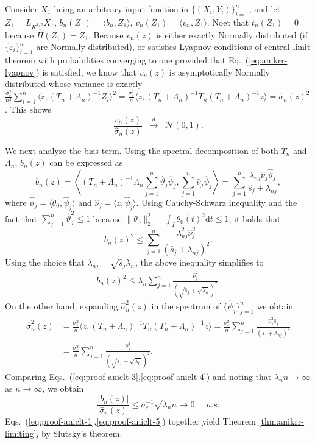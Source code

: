 \documentclass[11pt,a4paper]{article}
\renewcommand{\hat}{\widehat}
\theoremstyle{definition}
\theoremstyle{plain}
\theoremstyle{remark}
\newcommand{\ud}{\mathrm d}
\begin{document}
Consider $X_1$ being an arbitrary input function in $\{(X_i,Y_i)\}_{i=1}^n$,
and let $Z_1=L_{K^{1/2}}X_1$, $b_n(Z_1)=\langle b_n,Z_1\rangle$, $v_n(Z_1)=\langle v_n,Z_1\rangle$.
Noet that $t_n(Z_1)=0$ because $\hat\Pi(Z_1)=Z_1$.
Because $v_n(z)$ is either exactly Normally distributed (if $\{\varepsilon_i\}_{i=1}^n$ are Normally distributed), or satisfies Lyapnov conditions of central limit theorem with probabilities converging to one
provided that Eq.~(\ref{eq:anikrr-lyapnov}) is satisfied, we know that $v_n(z)$ is asymptotically Normally distributed whose variance is exactly $\frac{\sigma_\varepsilon^2}{n^2}\sum_{i=1}^n\langle z, (T_n+\Lambda_n)^{-1}Z_i\rangle^2 = \frac{\sigma_\varepsilon^2}{n}\langle z, (T_n+\Lambda_n)^{-1}T_n(T_n+\Lambda_n)^{-1}z\rangle=\hat\sigma_n(z)^2$. This shows
\begin{equation}
\frac{v_n(z)}{\hat\sigma_n(z)}\;\;\overset{d}{\to}\;\;\mathcal N(0,1).
\label{eq:proof-aniclt-2}
\end{equation}

We next analyze the bias term. Using the spectral decomposition of both $T_n$ and $\Lambda_n$, $b_n(z)$ can be expressed as
$$
b_n(z) = \left\langle(T_n+\Lambda_n)^{-1}\Lambda_n\sum_{j=1}^n\hat\vartheta_j\hat\psi_j, \sum_{j=1}^n\hat\nu_j\hat\psi_j\right\rangle = \sum_{j=1}^n\frac{\lambda_{nj}\hat\nu_j\hat\vartheta_j}{\hat s_j+\lambda_{nj}},
$$
where $\hat\vartheta_j=\langle\theta_0,\hat\psi_j\rangle$ and $\hat\nu_j = \langle z,\hat\psi_j\rangle$.
Using Cauchy-Schwarz inequality and the fact that $\sum_{j=1}^n\hat\vartheta_j^2\leq 1$ because $\|\theta_0\|_2^2 = \int_I\theta_0(t)^2\ud t\leq 1$, it holds that
$$
b_n(z)^2 \leq \sum_{j=1}^n\frac{\lambda_{nj}^2\hat\nu_j^2}{(\hat s_j+\lambda_{nj})^2}.
$$
Using the choice that $\lambda_{nj}=\sqrt{\hat s_j\lambda_n}$, the above inequality simplifies to
\begin{align}
b_n(z)^2 \leq \lambda_n\sum_{j=1}^n\frac{\hat\nu_j^2}{(\sqrt{\hat s_j}+\sqrt{\lambda_n})^2}.
\label{eq:proof-aniclt-3}
\end{align}
On the other hand, expanding $\hat\sigma_n^2(z)$ in the spectrum of $\{\hat\psi_j\}_{j=1}^n$ we obtain
\begin{align}
\hat\sigma_n^2(z) &= \frac{\sigma_\varepsilon^2}{n}\langle z, (T_n+\Lambda_n)^{-1}T_n(T_n+\Lambda_n)^{-1}z\rangle = \frac{\sigma_\varepsilon^2}{n}\sum_{j=1}^n\frac{\hat\nu_j^2\hat s_j}{(\hat s_j+\lambda_{nj})^2}\nonumber\\
&=  \frac{\sigma_\varepsilon^2}{n}\sum_{j=1}^n\frac{\hat\nu_j^2}{(\sqrt{\hat s_j}+\sqrt{\lambda_n})^2}.
\label{eq:proof-aniclt-4}
\end{align}
Comparing Eqs.~(\ref{eq:proof-aniclt-3},\ref{eq:proof-aniclt-4}) and noting that $\lambda_n n\to\infty$ as $n\to\infty$, we obtain
\begin{equation}
\frac{|b_n(z)|}{\hat\sigma_n(z)} \leq \sigma_\varepsilon^{-1}\sqrt{\lambda_n n} \to 0\;\;\;\;\;a.s.
\label{eq:proof-aniclt-5}
\end{equation}
Eqs.~(\ref{eq:proof-aniclt-1},\ref{eq:proof-aniclt-5}) together yield Theorem \ref{thm:anikrr-limiting}, by Slutsky's theorem.
\end{document}
